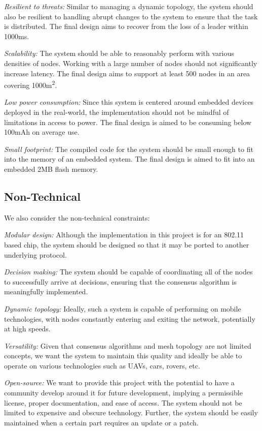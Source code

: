 \documentclass[compsoc]{IEEEtran}
\begin{document}
\textit{Resilient to threats:} Similar to managing a dynamic topology, the system should also be resilient to handling abrupt changes to the system to ensure that the task is distributed. The final design aims to recover from the loss of a leader within 1000\si{\ms}.

\textit{Scalability:} The system should be able to reasonably perform with various densities of nodes. Working with a large number of nodes should not significantly increase latency. The final design aims to support at least 500 nodes in an area covering 1000\si{m^2}.

\textit{Low power consumption:} Since this system is centered around embedded devices deployed in the real-world, the implementation should not be mindful of limitations in access to power. The final design is aimed to be consuming below 100\si{mAh} on average use.

\textit{Small footprint:} The compiled code for the system should be small enough to fit into the memory of an embedded system. The final design is aimed to fit into an embedded 2\si{MB} flash memory.

\subsection{Non-Technical}

We also consider the non-technical constraints:

\textit{Modular design:} Although the implementation in this project is for an 802.11 based chip, the system should be designed so that it may be ported to another underlying protocol.

\textit{Decision making:} The system should be capable of coordinating all of the nodes to successfully arrive at decisions, ensuring that the consensus algorithm is meaningfully implemented.

\textit{Dynamic topology:} Ideally, such a system is capable of performing on mobile technologies, with nodes constantly entering and exiting the network, potentially at high speeds.

\textit{Versatility:} Given that consensus algorithms and mesh topology are not limited concepts, we want the system to maintain this quality and ideally be able to operate on various technologies such as UAVs, cars, rovers, etc.

\textit{Open-source:} We want to provide this project with the potential to have a community develop around it for future development, implying a permissible license, proper documentation, and ease of access. The system should not be limited to expensive and obscure technology. Further, the system should be easily maintained when a certain part requires an update or a patch.
\end{document}
